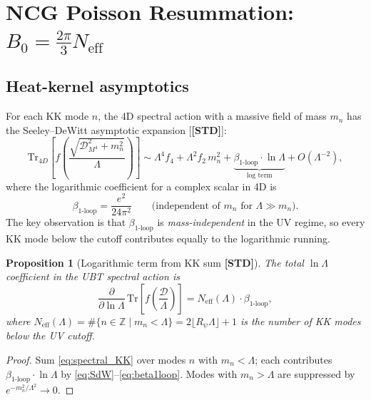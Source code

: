 \documentclass[12pt,a4paper]{article}
\newtheorem{proposition}[theorem]{Proposition}
\theoremstyle{definition}
\theoremstyle{remark}
\newcommand{\STD}{\textbf{[STD]}}
\newcommand{\Neff}{N_{\mathrm{eff}}}
\begin{document}
\section{NCG Poisson Resummation: $B_0 = \tfrac{2\pi}{3}\Neff$}
\label{sec:b0_derivation}

\subsection{Heat-kernel asymptotics}

For each KK mode $n$, the 4D spectral action with a massive field of
mass $m_n$ has the Seeley--DeWitt asymptotic expansion [\STD]:
\begin{equation}
\mathrm{Tr}_{4D}\!\left[f\!\left(\frac{\sqrt{\mathcal{D}_{M^4}^2+m_n^2}}{\Lambda}\right)\right]
\sim \Lambda^4 f_4 + \Lambda^2 f_2\,m_n^2
  + \underbrace{\beta_{\mathrm{1\text{-}loop}}\cdot\ln\Lambda}_{\text{log term}}
  + O(\Lambda^{-2}),
\label{eq:SdW}
\end{equation}
where the logarithmic coefficient for a complex scalar in 4D is
\begin{equation}
\beta_{\mathrm{1\text{-}loop}} = \frac{e^2}{24\pi^2}
\qquad \text{(independent of }m_n\text{ for }\Lambda\gg m_n).
\label{eq:beta1loop}
\end{equation}
The key observation is that $\beta_{\mathrm{1\text{-}loop}}$ is \emph{mass-independent}
in the UV regime, so every KK mode below the cutoff contributes equally to the
logarithmic running.

\begin{proposition}[Logarithmic term from KK sum \STD]
\label{prop:log}
The total $\ln\Lambda$ coefficient in the UBT spectral action is
\begin{equation}
\boxed{
\frac{\partial}{\partial\ln\Lambda}\,
\mathrm{Tr}\!\left[f\!\left(\frac{\mathcal{D}}{\Lambda}\right)\right]
= \Neff(\Lambda)\cdot\beta_{\mathrm{1\text{-}loop}},}
\label{eq:logcoeff}
\end{equation}
where $\Neff(\Lambda) = \#\{n\in\mathbb{Z}\mid m_n < \Lambda\}
= 2\lfloor R_\psi\Lambda\rfloor + 1$ is the number of KK modes below the
UV cutoff.
\end{proposition}

\begin{proof}
Sum \eqref{eq:spectral_KK} over modes $n$ with $m_n<\Lambda$;
each contributes $\beta_{\mathrm{1\text{-}loop}}\cdot\ln\Lambda$ by
\eqref{eq:SdW}--\eqref{eq:beta1loop}.
Modes with $m_n>\Lambda$ are suppressed by $e^{-m_n^2/\Lambda^2}\to 0$.
\end{proof}
\end{document}

